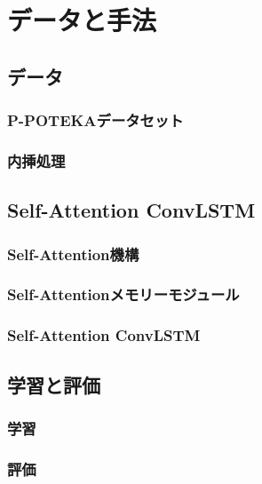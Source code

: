 \section{データと手法}

\subsection{データ}
\subsubsection{P-POTEKAデータセット}

\subsubsection{内挿処理}


\subsection{Self-Attention ConvLSTM}
\subsubsection{Self-Attention機構}

\subsubsection{Self-Attentionメモリーモジュール}

\subsubsection{Self-Attention ConvLSTM}


\subsection{学習と評価}
\subsubsection{学習}

\subsubsection{評価}
